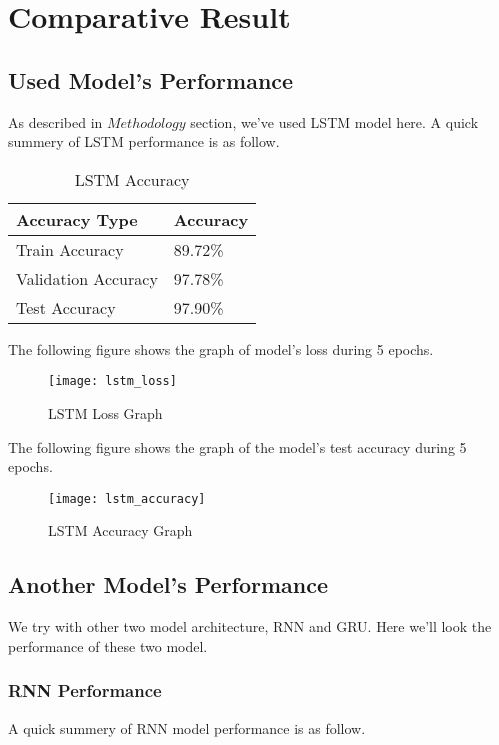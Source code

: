 \chapter{Comparative Result}
	
	\section{Used Model's Performance}
	As described in $Methodology$ section, we've used LSTM model here. A quick summery of LSTM performance is as follow. \\
	
	\begin{table}[H]
		\centering
		\begin{tabular}{|l|l|}
			\hline
			Accuracy Type       & Accuracy \\ \hline
			Train Accuracy      & 89.72\%  \\ \hline
			Validation Accuracy & 97.78\%  \\ \hline
			Test Accuracy       & 97.90\%  \\ \hline
		\end{tabular}
		\caption{LSTM Accuracy}
	\end{table}
	
	
	The following figure shows the graph of model's loss during 5 epochs.\\
	
	\begin{figure}[H]
		\centering
		\texttt{[image: lstm\_loss]}
		\caption{LSTM Loss Graph}
	\end{figure}
	\vline

	The following figure shows the graph of the model's test accuracy during 5 epochs.\\
	\begin{figure}[H]
		\centering
		\texttt{[image: lstm\_accuracy]}
		\caption{LSTM Accuracy Graph}
	\end{figure}
	\vline
	
	
	\section{Another Model's Performance}
	We try with other two model architecture, RNN and GRU. Here we'll look the performance of these two model. \\
	
		\subsection{RNN Performance}
		A quick summery of RNN model performance is as follow. \\
		
